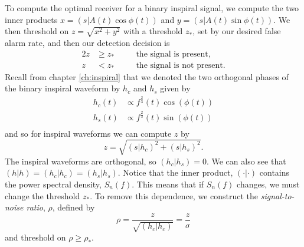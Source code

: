 To compute the optimal receiver for a binary inspiral signal, we compute the
two inner products $x = (s|A(t)\cos\phi(t))$ and $y = (s|A(t)\sin\phi(t))$. We
then threshold on $z = \sqrt{x^2+y^2}$ with a threshold $z_\ast$, set by our
desired false alarm rate, and then our detection decision is
\begin{alignat}{2}
z &\ge z_* &\quad&\text{the signal is present}, \\
z &< z_* &&\text{the signal is not present}.
\end{alignat}
Recall from chapter \ref{ch:inspiral} that we denoted the two orthogonal
phases of the binary inspiral waveform by $h_c$ and $h_s$ given by
\begin{align}
h_c(t) &\propto f^\frac{2}{3}(t) \cos(\phi(t)) \\
h_s(t) &\propto f^\frac{2}{3}(t) \sin(\phi(t)) \\
\end{align}
and so for inspiral waveforms we can compute $z$ by
\begin{equation}
z = \sqrt{(s|h_c)^2 + (s|h_s)^2}.
\end{equation}
The inspiral waveforms are orthogonal, so $(h_c|h_s) = 0$. We can also see
that $(h|h) = (h_c|h_c) = (h_s|h_s)$. Notice that the inner product,
$(\cdot|\cdot)$ contains the power spectral density, $S_n(f)$. This means that
if $S_n(f)$ changes, we must change the threshold $z_\ast$. To remove this
dependence, we construct the \emph{signal-to-noise ratio}, $\rho$, defined by
\begin{equation}
\rho = \frac{z}{\sqrt{(h_c|h_c)}} = \frac{z}{\sigma}
\end{equation}
and threshold on $\rho \ge \rho_\ast$.

